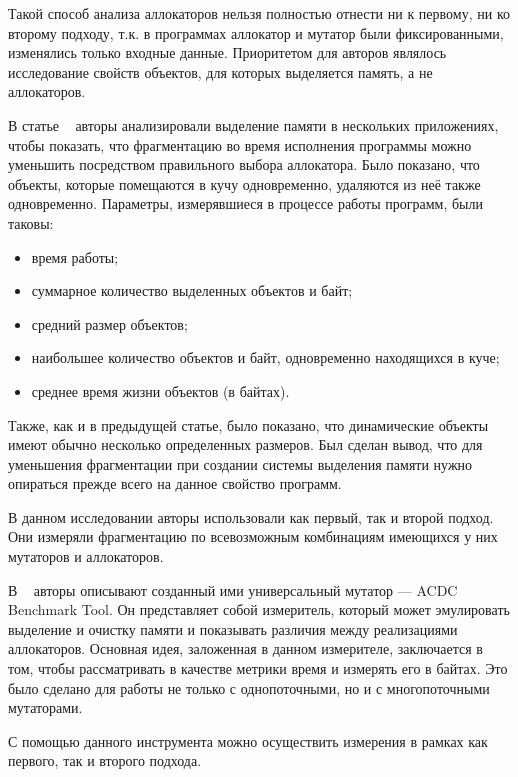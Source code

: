 \documentclass[12pt,a4paper]{article}
\begin{document}
   Такой способ анализа аллокаторов нельзя полностью отнести ни к первому, ни ко второму подходу, т.к. в программах аллокатор и мутатор
   были фиксированными, изменялись только входные данные. Приоритетом для авторов являлось исследование свойств объектов, для которых выделяется
   память, а не аллокаторов.
   
   В статье ~\cite{fragm} авторы анализировали выделение памяти в нескольких приложениях, чтобы показать, что фрагментацию
   во время исполнения программы можно уменьшить посредством правильного выбора аллокатора. Было показано, что объекты,
   которые помещаются в кучу одновременно, удаляются из неё также одновременно. 
   Параметры, измерявшиеся в процессе работы программ, были таковы:
   
   \begin{itemize}
      \item время работы;
      \item суммарное количество выделенных объектов и байт;
      \item средний размер объектов;
      \item наибольшее количество объектов и байт, одновременно находящихся в куче;
      \item среднее время жизни объектов (в байтах).
   \end{itemize}
   
   Также, как и в предыдущей статье, было показано, что динамические объекты имеют обычно несколько определенных размеров. Был сделан
   вывод, что для уменьшения фрагментации при создании системы выделения памяти нужно опираться прежде всего на данное свойство программ.
   
   В данном исследовании авторы использовали как первый, так и второй подход. Они измеряли фрагментацию по всевозможным комбинациям имеющихся 
   у них мутаторов и аллокаторов.
   
   В ~\cite{un_mutator} авторы описывают созданный ими универсальный мутатор --- ACDC Benchmark Tool. Он представляет собой измеритель, 
   который может эмулировать выделение и очистку памяти и показывать различия между реализациями аллокаторов. Основная идея, заложенная в данном 
   измерителе, заключается в том, чтобы рассматривать в качестве метрики время и измерять его в байтах. Это было сделано для работы не только с
   однопоточными, но и с многопоточными мутаторами. 
   
   С помощью данного инструмента можно осуществить измерения в рамках как первого, так и второго подхода.
   
\end{document}
